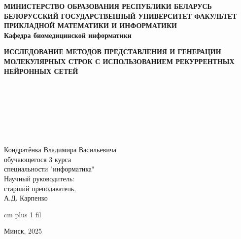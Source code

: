 \documentclass[../main.tex]{subfiles}
\begin{document}
\onlyinsubfile{
    \renewcommand{\contentsname}{ОГЛАВЛЕНИЕ}
    \setcounter{tocdepth}{3}
    \tableofcontents
}

\thispagestyle{empty}
\normalsize
\begin{center}
{\fontsize{16}{16}\selectfont \textbf{МИНИСТЕРСТВО ОБРАЗОВАНИЯ РЕСПУБЛИКИ БЕЛАРУСЬ БЕЛОРУССКИЙ ГОСУДАРСТВЕННЫЙ УНИВЕРСИТЕТ ФАКУЛЬТЕТ ПРИКЛАДНОЙ МАТЕМАТИКИ И ИНФОРМАТИКИ}} \\
{\fontsize{16}{16}\selectfont \textbf{Кафедра биомедицинской информатики}}
\end{center}
\vspace{4ex}
\normalsize

\normalsize
\vspace{20ex}
\begin{center}

\textbf{ИССЛЕДОВАНИЕ МЕТОДОВ ПРЕДСТАВЛЕНИЯ И ГЕНЕРАЦИИ МОЛЕКУЛЯРНЫХ СТРОК С ИСПОЛЬЗОВАНИЕМ РЕКУРРЕНТНЫХ НЕЙРОННЫХ СЕТЕЙ}\\
\vspace{2ex}

\end{center}


\normalsize
\vspace{10ex}
\begin{minipage}{0.4\textwidth}
  \begin{flushleft}
$\,$\\
$\,$\\
$\,$\\
$\,$\\
\end{flushleft}
\end{minipage}
$\quad$
\begin{minipage}{0.5\textwidth}
  \begin{flushleft}
Кондратёнка Владимира Васильевича\\
обучающегося 3 курса\\
специальности "информатика"\\
\vspace{2ex}
Научный руководитель:\\
старший преподаватель,\\
А.Д. Карпенко\\
  \end{flushleft}
\end{minipage}


 cm plus 1 fil
\begin{center}
Минск, 2025
\end{center}
\eject

\onlyinsubfile{
    
}
\end{document}
